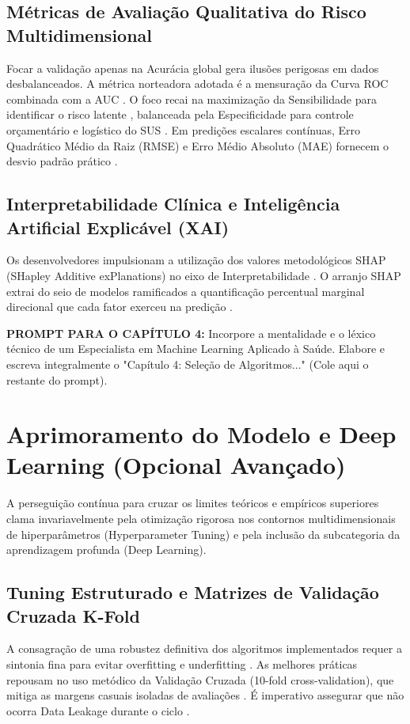 \documentclass[12pt,openright,oneside,a4paper,brazil]{abntex2}
\begin{document}
\section{Métricas de Avaliação Qualitativa do Risco Multidimensional}
Focar a validação apenas na Acurácia global gera ilusões perigosas em dados desbalanceados. A métrica norteadora adotada é a mensuração da Curva ROC combinada com a AUC \cite{ref10, ref14, ref37}. O foco recai na maximização da Sensibilidade para identificar o risco latente \cite{ref11}, balanceada pela Especificidade para controle orçamentário e logístico do SUS \cite{ref10, ref11, ref33}. Em predições escalares contínuas, Erro Quadrático Médio da Raiz (RMSE) e Erro Médio Absoluto (MAE) fornecem o desvio padrão prático \cite{ref13}.

\section{Interpretabilidade Clínica e Inteligência Artificial Explicável (XAI)}
Os desenvolvedores impulsionam a utilização dos valores metodológicos SHAP (SHapley Additive exPlanations) no eixo de Interpretabilidade \cite{ref11, ref26}. O arranjo SHAP extrai do seio de modelos ramificados a quantificação percentual marginal direcional que cada fator exerceu na predição \cite{ref11}.

\begin{mdframed}[backgroundcolor=gray!10]
\textbf{PROMPT PARA O CAPÍTULO 4:} Incorpore a mentalidade e o léxico técnico de um Especialista em Machine Learning Aplicado à Saúde. Elabore e escreva integralmente o "Capítulo 4: Seleção de Algoritmos..." (Cole aqui o restante do prompt).
\end{mdframed}

\chapter{Aprimoramento do Modelo e Deep Learning (Opcional Avançado)}

A perseguição contínua para cruzar os limites teóricos e empíricos superiores clama invariavelmente pela otimização rigorosa nos contornos multidimensionais de hiperparâmetros (Hyperparameter Tuning) e pela inclusão da subcategoria da aprendizagem profunda (Deep Learning).

\section{Tuning Estruturado e Matrizes de Validação Cruzada K-Fold}
A consagração de uma robustez definitiva dos algoritmos implementados requer a sintonia fina para evitar overfitting e underfitting \cite{ref10}. As melhores práticas repousam no uso metódico da Validação Cruzada (10-fold cross-validation), que mitiga as margens casuais isoladas de avaliações \cite{ref10, ref14}. É imperativo assegurar que não ocorra Data Leakage durante o ciclo \cite{ref28}.
\end{document}
